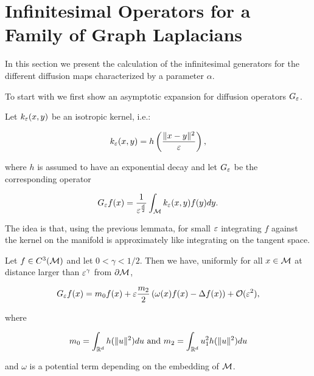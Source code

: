 \section{Infinitesimal Operators for a Family of Graph Laplacians}
In this section we present the calculation of the infinitesimal generators for the different diffusion maps characterized by a parameter $\alpha$.

To start with we first show an asymptotic expansion for diffusion operators $G_\varepsilon$.

Let $k_\varepsilon(x,y)$ be an isotropic kernel, i.e.:

\begin{equation*}
k_\varepsilon(x,y)=h\left(\frac{\|x-y\|^2}{\varepsilon} \right),
\end{equation*}

where $h$ is assumed to have an exponential decay and let $G_\varepsilon$ be the corresponding operator

\begin{equation*}
G_\varepsilon f(x)=\frac{1}{\varepsilon^\frac{d}{2}}\int_{\mathcal{M}} k_\varepsilon(x,y)f(y)dy.
\end{equation*}

The idea is that, using the previous lemmata, for small $\varepsilon$ integrating $f$ against the kernel on the manifold is approximately like integrating on the tangent space.

\begin{theorem}\label{thm:diffOpExpansion}
Let $f\in C^3(\mathcal{M})$ and let $0 <\gamma<1/2$. Then we have, uniformly for all $x\in\mathcal{M}$ at distance larger than $\varepsilon^\gamma$ from $\partial\mathcal{M}$,

\begin{equation*}
G_\varepsilon f(x)=m_0 f(x)+\varepsilon\frac{m_2}{2}\left(\omega(x)f(x)-\Delta f(x) \right)+\mathcal{O}(\varepsilon^2),
\end{equation*}

where

\begin{equation*}
m_0=\int_{\mathbb{R}^d} h(\|u\|^2)du \text{ and } m_2=\int_{\mathbb{R}^d} u_1^2 h(\|u\|^2)du
\end{equation*}

and $\omega$ is a potential term depending on the embedding of $\mathcal{M}$.
\end{theorem}

